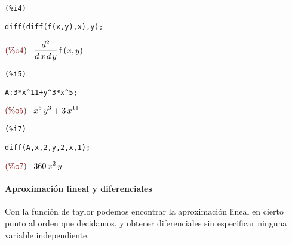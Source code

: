 \documentclass[12pt]{article}
\begin{document}
\noindent
\begin{minipage}[t]{8ex}{\color{red}\bf
\begin{verbatim}
(%i4) 
\end{verbatim}}
\end{minipage}
\begin{minipage}[t]{\textwidth}{\color{blue}
\begin{verbatim}
diff(diff(f(x,y),x),y);
\end{verbatim}}
\end{minipage}
\begin{math}\displaystyle
\parbox{8ex}{\color{labelcolor}(\%o4) }
\frac{{d}^{2}}{d\,x\,d\,y}\,\mathrm{f}\left( x,y\right) 
\end{math}


\noindent
\begin{minipage}[t]{8ex}{\color{red}\bf
\begin{verbatim}
(%i5) 
\end{verbatim}}
\end{minipage}
\begin{minipage}[t]{\textwidth}{\color{blue}
\begin{verbatim}
A:3*x^11+y^3*x^5;
\end{verbatim}}
\end{minipage}
\begin{math}\displaystyle
\parbox{8ex}{\color{labelcolor}(\%o5) }
{x}^{5}\,{y}^{3}+3\,{x}^{11}
\end{math}


\noindent
\begin{minipage}[t]{8ex}{\color{red}\bf
\begin{verbatim}
(%i7) 
\end{verbatim}}
\end{minipage}
\begin{minipage}[t]{\textwidth}{\color{blue}
\begin{verbatim}
diff(A,x,2,y,2,x,1);
\end{verbatim}}
\end{minipage}
\begin{math}\displaystyle
\parbox{8ex}{\color{labelcolor}(\%o7) }
360\,{x}^{2}\,y
\end{math}

\pagebreak

\paragraph{Aproximación lineal y diferenciales} Con la función de taylor podemos encontrar la aproximación lineal en cierto punto al orden que decidamos, y obtener diferenciales sin especificar ninguna variable independiente.
\end{document}
